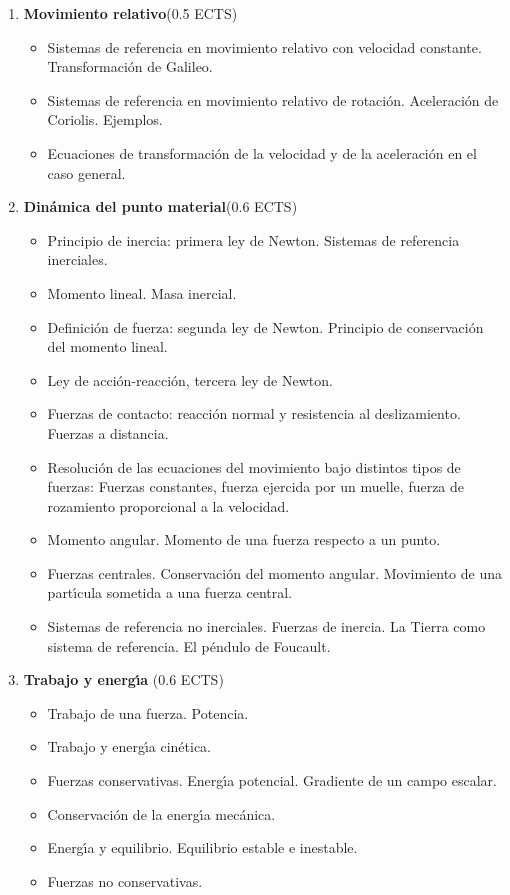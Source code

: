 \begin{enumerate}[{\bf 1. }]
\item {\bf  Movimiento relativo}\hfill (0.5 ECTS)
\begin{itemize} \addtolength{\itemsep}{-0.25\baselineskip}
\noindent
\item  Sistemas de referencia en movimiento relativo con velocidad constante.
 Transformaci\'{o}n de Galileo.
\item Sistemas de referencia en movimiento relativo de rotaci\'{o}n.
 Aceleraci\'{o}n de Coriolis. Ejemplos.
\item Ecuaciones de transformaci\'{o}n de la velocidad y de la
 aceleraci\'{o}n en el caso general.
\end{itemize}
%

\item {\bf  Din\'{a}mica del punto material}\hfill  (0.6 ECTS)
\begin{itemize} \addtolength{\itemsep}{-0.25\baselineskip}
\noindent
\item Principio de inercia: primera ley de Newton. Sistemas de referencia inerciales.
\item Momento lineal. Masa inercial.
\item Definici\'{o}n de fuerza: segunda ley de Newton. Principio de conservaci\'{o}n del momento lineal.
\item  Ley de acci\'{o}n-reacci\'{o}n, tercera ley de Newton.
\item  Fuerzas de contacto: reacci\'{o}n normal y resistencia al deslizamiento. Fuerzas a distancia.
\item  Resoluci\'{o}n de las ecuaciones del movimiento bajo distintos tipos de fuerzas:
Fuerzas constantes, fuerza ejercida por un muelle, fuerza de rozamiento proporcional a la velocidad.
\item  Momento angular. Momento de una fuerza respecto a un punto.
\item  Fuerzas centrales. Conservaci\'{o}n del momento angular. 
Movimiento de una part\'{\i}cula sometida a una fuerza central.
\item  Sistemas de referencia no inerciales. Fuerzas de inercia.
 La Tierra como sistema de referencia. El p\'{e}ndulo de Foucault.
\end{itemize}
%

\item {\bf Trabajo y energ\'{\i}a} \hfill (0.6 ECTS)
\begin{itemize} \addtolength{\itemsep}{-0.25\baselineskip}
\noindent
\item Trabajo de una fuerza. Potencia.
\item Trabajo y energ\'{\i}a cin\'{e}tica.
\item Fuerzas conservativas. Energ\'{\i}a potencial. Gradiente de un campo escalar.
\item Conservaci\'{o}n de la energ\'{\i}a mec\'{a}nica.
\item Energ\'{\i}a y equilibrio. Equilibrio estable e inestable.
\item Fuerzas no conservativas.
\end{itemize}
%


\end{enumerate}
